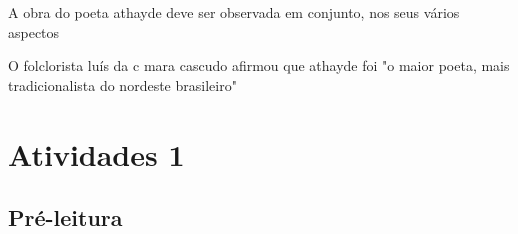 \documentclass[12pt]{extarticle}
\begin{document}
A obra do poeta athayde deve ser observada em conjunto, nos seus vários aspectos

O folclorista luís da c mara cascudo afirmou que athayde foi "o maior poeta, mais tradicionalista do nordeste brasileiro"


\section{Atividades 1}


\subsection{Pré-leitura}


\end{document}
